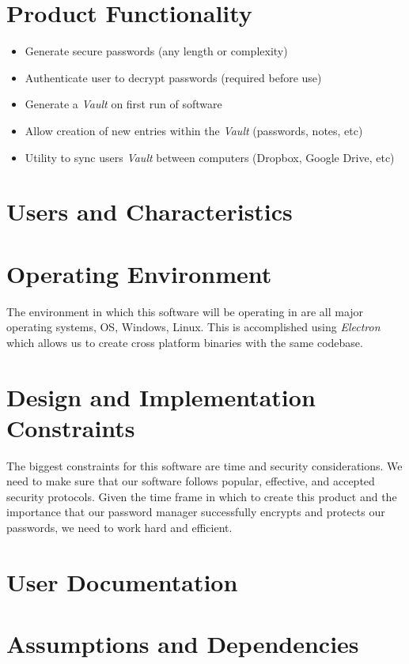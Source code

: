 \documentclass[12pt]{report}
\begin{document}
\section{Product Functionality}

\begin{itemize}
    \item Generate secure passwords (any length or complexity)
    \item Authenticate user to decrypt passwords (required before use)
    \item Generate a \textit{Vault} on first run of software
    \item Allow creation of new entries within the \textit{Vault} (passwords, notes, etc)
    \item Utility to sync users \textit{Vault} between computers (Dropbox, Google Drive, etc)
\end{itemize}

\section{Users and Characteristics}

\section{Operating Environment}
The environment in which this software will be operating in are all
major operating systems, OS, Windows, Linux. This is accomplished using
\textit{Electron} which allows us to create cross platform binaries
with the same codebase.

\section{Design and Implementation Constraints}
The biggest constraints for this software are time and security considerations.
We need to make sure that our software follows popular, effective, and
accepted security protocols. Given the time frame in which to create this
product and the importance that our password manager successfully encrypts
and protects our passwords, we need to work hard and efficient.

\section{User Documentation}

\section{Assumptions and Dependencies}
\end{document}
